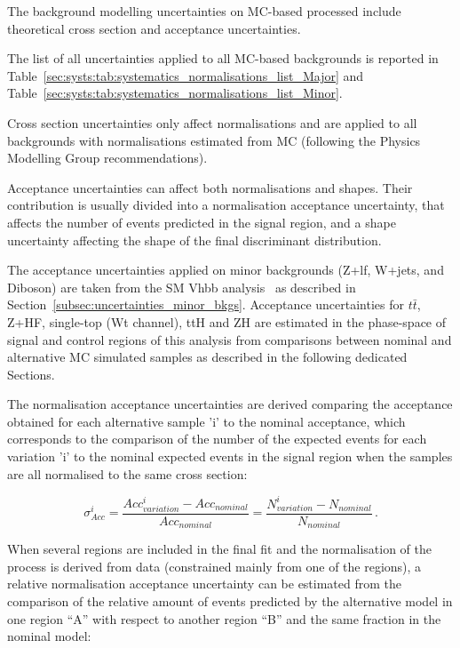 The background modelling uncertainties on
 MC-based processed include theoretical cross section and acceptance uncertainties. 

The list of all uncertainties applied to all MC-based backgrounds is reported in Table~\ref{sec:systs:tab:systematics_normalisations_list_Major} and Table~\ref{sec:systs:tab:systematics_normalisations_list_Minor}. 

Cross section uncertainties only affect normalisations and are applied to all backgrounds with normalisations estimated from MC (following the Physics Modelling Group recommendations).

Acceptance uncertainties can affect both normalisations and shapes. Their contribution is usually divided into a normalisation acceptance uncertainty, that affects the number of events predicted in the signal region, and a shape uncertainty affecting the shape of the final discriminant distribution. 

The acceptance uncertainties applied on minor backgrounds (Z+lf, W+jets, and Diboson) are taken from the SM Vhbb analysis~\cite{ATLAS-CONF-2020-006} as described in Section~\ref{subsec:uncertainties_minor_bkgs}. Acceptance uncertainties for $t\bar{t}$, Z+HF, single-top (Wt channel), ttH and ZH are estimated in the phase-space of signal and control regions of this analysis from comparisons between nominal and alternative MC simulated samples as described in the following dedicated Sections. 

The normalisation acceptance uncertainties are derived comparing the acceptance obtained for each alternative sample 'i' to the nominal acceptance, which corresponds to the comparison of the number of the expected events for each variation 'i' to the nominal expected events in the signal region when the samples are all normalised to the same cross section:

\begin{equation}
\sigma_{Acc}^{i}= \frac{Acc_{variation}^{i} - Acc_{nominal}}{Acc_{nominal}} = \frac{N_{variation}^{i}-N_{nominal}}{N_{nominal}}\,.
\label{eq:acceptance_unc}
\end{equation}

When several regions are included in the final fit and the normalisation of the process is derived from data (constrained mainly from one of the regions), a relative normalisation acceptance uncertainty can be estimated from the comparison of the relative amount of events predicted by the alternative model in one region “A” with respect to another region “B” and the same fraction in the nominal model:%

